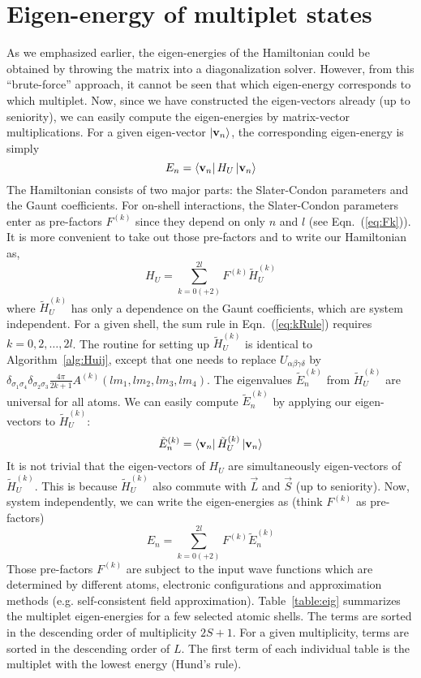 \section{Eigen-energy of multiplet states}
As we emphasized earlier, the eigen-energies of the Hamiltonian could be
obtained by throwing the matrix into a diagonalization solver. However, from this
``brute-force'' approach, it cannot be seen that which eigen-energy corresponds to which
multiplet. Now, since we have constructed the eigen-vectors already (up to seniority),
we can easily compute the eigen-energies by matrix-vector multiplications.
For a given eigen-vector $\Ket{\vec{v}_n}$, the corresponding eigen-energy is simply
\begin{equation}\label{eq:En}
E_n = \Bra{\vec{v}_n} H_U \Ket{\vec{v}_n}
\end{equation}
%
The Hamiltonian consists of two major parts: the Slater-Condon
parameters and the Gaunt coefficients. For on-shell interactions, the Slater-Condon
parameters enter as pre-factors $F^{(k)}$ since they depend on only $n$ and $l$ (see
Eqn.~(\ref{eq:Fk})). It is more convenient to take out those pre-factors
and to write our Hamiltonian as,
\begin{equation}\label{eq:Hk}
H_U = \sum_{k=0(+2)}^{2l} F^{(k)} \tilde{H}_U^{(k)}
\end{equation}
where $\tilde{H}_U^{(k)}$ has only a dependence on the Gaunt coefficients,
which are system independent.
For a given shell, the sum rule in Eqn.~(\ref{eq:kRule}) requires $k=0,2,\ldots,2l$.
The routine for setting up $\tilde{H}_U^{(k)}$ is identical to Algorithm~\ref{alg:Huij},
except that one needs to replace $U_{\alpha\beta\gamma\delta}$ by
$\delta_{\sigma_1\sigma_4} \delta_{\sigma_2\sigma_3} \frac{4\pi}{2k+1} A^{(k)}(lm_1,lm_2,lm_3,lm_4)$.
The eigenvalues $\tilde{E}_n^{(k)}$ from $\tilde{H}_U^{(k)}$ are universal for all atoms.
We can easily compute $\tilde{E}_n^{(k)}$ by applying our eigen-vectors to $\tilde{H}_U^{(k)}$:
\begin{equation}\label{eq:Ekn}
\tilde{E}_n^{(k)} = \Bra{\vec{v}_n} \tilde{H}_U^{(k)} \Ket{\vec{v}_n}
\end{equation}
%
It is not trivial that the eigen-vectors of $H_U$ are simultaneously eigen-vectors of
$\tilde{H}_U^{(k)}$. This is because $\tilde{H}_U^{(k)}$ also commute with $\vec{L}$
and $\vec{S}$ (up to seniority). Now, system independently, we can write the eigen-energies
as (think $F^{(k)}$ as pre-factors)
\begin{equation}\label{eq:Eksum}
E_n = \sum_{k=0(+2)}^{2l} F^{(k)} \tilde{E}_n^{(k)}
\end{equation}
%
Those pre-factors $F^{(k)}$ are subject to the input wave functions which
are determined by different atoms, electronic
configurations and approximation methods (e.g. self-consistent field approximation).
Table~\ref{table:eig} summarizes the multiplet eigen-energies for a few selected
atomic shells. The terms are sorted in the descending order of multiplicity
$2S+1$. For a given multiplicity, terms are sorted in the descending order
of $L$. The first term of each individual table is the multiplet with the
lowest energy (Hund's rule).

